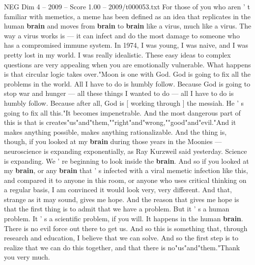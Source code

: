\begin{textsample}{NEG Dim 4 – 2009 – Score 1.00 – 2009/t000053.txt}
For those of you who aren ' t familiar with memetics, a meme has been defined as an idea that replicates in the human \textbf{brain} and moves from \textbf{brain} to \textbf{brain} like a virus, much like a virus.
The way a virus works is — it can infect and do the most damage to someone who has a compromised immune system.
In 1974, I was young, I was naive, and I was pretty lost in my world.
I was really idealistic.
These easy ideas to complex questions are very appealing when you are emotionally vulnerable.
What happens is that circular logic takes over."Moon is one with God.
God is going to fix all the problems in the world.
All I have to do is humbly follow.
Because God is going to stop war and hunger — all these things I wanted to do — all I have to do is humbly follow.
Because after all, God is [ working through ] the messiah.
He ' s going to fix all this."It becomes impenetrable.
And the most dangerous part of this is that is creates"us"and"them,""right"and"wrong,""good"and"evil."And it makes anything possible, makes anything rationalizable.
And the thing is, though, if you looked at my \textbf{brain} during those years in the Moonies — neuroscience is expanding exponentially, as Ray Kurzweil said yesterday.
Science is expanding.
We ' re beginning to look inside the \textbf{brain}.
And so if you looked at my \textbf{brain}, or any \textbf{brain} that ' s infected with a viral memetic infection like this, and compared it to anyone in this room, or anyone who uses critical thinking on a regular basis, I am convinced it would look very, very different.
And that, strange as it may sound, gives me hope.
And the reason that gives me hope is that the first thing is to admit that we have a problem.
But it ' s a human problem.
It ' s a scientific problem, if you will.
It happens in the human \textbf{brain}.
There is no evil force out there to get us.
And so this is something that, through research and education, I believe that we can solve.
And so the first step is to realize that we can do this together, and that there is no"us"and"them."Thank you very much.

\end{textsample}
